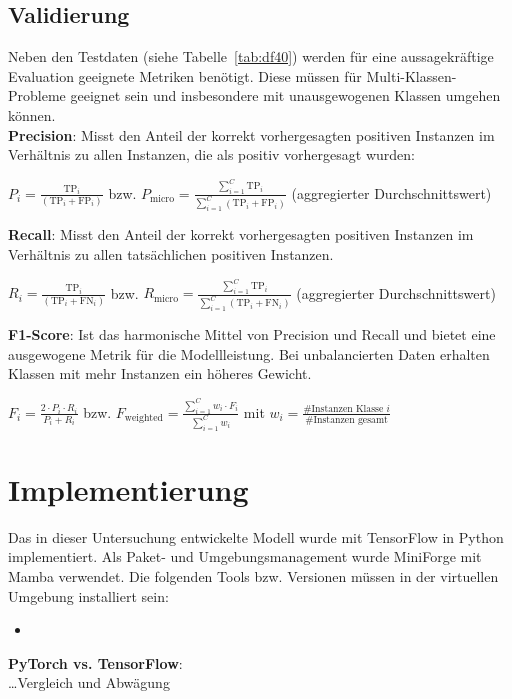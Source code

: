 \documentclass{article}
\begin{document}
\subsection{Validierung}\label{ssec:validation}
Neben den Testdaten (siehe Tabelle~\ref{tab:df40}) werden für eine aussagekräftige Evaluation geeignete Metriken benötigt.
Diese müssen für Multi-Klassen-Probleme geeignet sein und insbesondere mit unausgewogenen Klassen umgehen können.
\\[0.5em]
\textbf{Precision}: Misst den Anteil der korrekt vorhergesagten positiven Instanzen im Verhältnis zu allen Instanzen, die als positiv vorhergesagt wurden:
    \begin{center}
        $\displaystyle P_i=\frac{\text{TP}_i}{(\text{TP}_i+\text{FP}_i)}$ bzw. $\displaystyle P_\text{micro}=\frac{\sum_{i=1}^C\text{TP}_i}{\sum_{i=1}^C(\text{TP}_i+\text{FP}_i)}$ (aggregierter Durchschnittswert)
    \end{center}
\textbf{Recall}: Misst den Anteil der korrekt vorhergesagten positiven Instanzen im Verhältnis zu allen tatsächlichen positiven Instanzen.
    \begin{center}
        $\displaystyle R_i=\frac{\text{TP}_i}{(\text{TP}_i+\text{FN}_i)}$ bzw. $\displaystyle R_\text{micro}=\frac{\sum_{i=1}^C\text{TP}_i}{\sum_{i=1}^C(\text{TP}_i+\text{FN}_i)}$ (aggregierter Durchschnittswert)
    \end{center}
\textbf{F1-Score}: Ist das harmonische Mittel von Precision und Recall und bietet eine ausgewogene Metrik für die Modellleistung. Bei unbalancierten Daten erhalten Klassen mit mehr Instanzen ein höheres Gewicht.
    \begin{center}
        $\displaystyle F_i=\frac{2\cdot P_i\cdot R_i}{P_i+R_i}$ bzw. $\displaystyle F_\text{weighted}=\frac{\sum_{i=1}^Cw_i\cdot F_i}{\sum_{i=1}^Cw_i}$ mit $w_i=\frac{\text{\#Instanzen Klasse }i}{\text{\#Instanzen gesamt}}$
    \end{center}

\section{Implementierung}\label{sec:implementation}
Das in dieser Untersuchung entwickelte Modell wurde mit TensorFlow in Python implementiert.
Als Paket- und Umgebungsmanagement wurde MiniForge mit Mamba verwendet.
Die folgenden Tools bzw. Versionen müssen in der virtuellen Umgebung installiert sein:
\begin{itemize}
    \item 
\end{itemize}
\textbf{PyTorch vs. TensorFlow}:\\
\dots Vergleich und Abwägung
\end{document}
